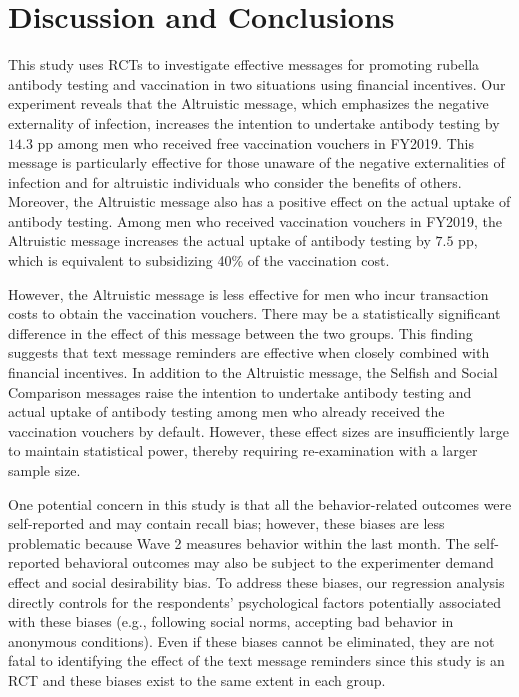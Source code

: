 \documentclass[
  11pt,
  a4paper
]{article}
\begin{document}
\hypertarget{conclusion}{%
\section{Discussion and Conclusions}\label{conclusion}}

This study uses RCTs to investigate effective messages for promoting rubella antibody testing and vaccination in two situations using financial incentives. Our experiment reveals that the Altruistic message, which emphasizes the negative externality of infection, increases the intention to undertake antibody testing by \(14.3\) pp among men who received free vaccination vouchers in FY2019. This message is particularly effective for those unaware of the negative externalities of infection and for altruistic individuals who consider the benefits of others. Moreover, the Altruistic message also has a positive effect on the actual uptake of antibody testing. Among men who received vaccination vouchers in FY2019, the Altruistic message increases the actual uptake of antibody testing by \(7.5\) pp, which is equivalent to subsidizing 40\% of the vaccination cost.

However, the Altruistic message is less effective for men who incur transaction costs to obtain the vaccination vouchers. There may be a statistically significant difference in the effect of this message between the two groups. This finding suggests that text message reminders are effective when closely combined with financial incentives. In addition to the Altruistic message, the Selfish and Social Comparison messages raise the intention to undertake antibody testing and actual uptake of antibody testing among men who already received the vaccination vouchers by default. However, these effect sizes are insufficiently large to maintain statistical power, thereby requiring re-examination with a larger sample size.

One potential concern in this study is that all the behavior-related outcomes were self-reported and may contain recall bias; however, these biases are less problematic because Wave 2 measures behavior within the last month. The self-reported behavioral outcomes may also be subject to the experimenter demand effect and social desirability bias. To address these biases, our regression analysis directly controls for the respondents' psychological factors potentially associated with these biases (e.g., following social norms, accepting bad behavior in anonymous conditions). Even if these biases cannot be eliminated, they are not fatal to identifying the effect of the text message reminders since this study is an RCT and these biases exist to the same extent in each group.
\end{document}
